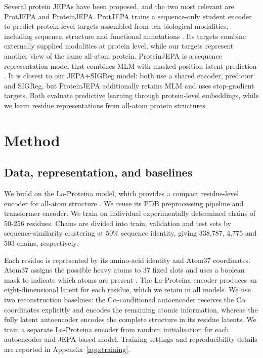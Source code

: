 \documentclass{article}
\begin{document}
Several protein JEPAs have been proposed, and the two most relevant are ProtJEPA and ProteinJEPA. ProtJEPA trains a sequence-only student encoder to predict protein-level targets assembled from ten biological modalities, including sequence, structure and functional annotations \citep{ravideshik2026protjepa}. Its targets combine externally supplied modalities at protein level, while our targets represent another view of the same all-atom protein. ProteinJEPA is a sequence representation model that combines MLM with masked-position latent prediction \citep{ofer2026proteinjepa}. It is closest to our JEPA+SIGReg model: both use a shared encoder, predictor and SIGReg, but ProteinJEPA additionally retains MLM and uses stop-gradient targets. Both evaluate predictive learning through protein-level embeddings, while we learn residue representations from all-atom protein structures.
\section{Method}
\label{sec:method}

\subsection{Data, representation, and baselines}

We build on the La-Proteina model, which provides a compact residue-level encoder for all-atom structure \citep{la-proteina}. We reuse its PDB preprocessing pipeline and transformer encoder. We train on individual experimentally determined chains of 50-256 residues. Chains are divided into train, validation and test sets by sequence-similarity clustering at 50\% sequence identity, giving 338{,}787, 4{,}775 and 503 chains, respectively.

Each residue is represented by its amino-acid identity and Atom37 coordinates. Atom37 assigns the possible heavy atoms to 37 fixed slots and uses a boolean mask to indicate which atoms are present \citep{ahdritz2024openfold}. The La-Proteina encoder produces an eight-dimensional latent for each residue, which we retain in all models. We use two reconstruction baselines: the C$\alpha$-conditioned autoencoder receives the C$\alpha$ coordinates explicitly and encodes the remaining atomic information, whereas the fully latent autoencoder encodes the complete structure in its residue latents. We train a separate La-Proteina encoder from random initialisation for each autoencoder and JEPA-based model. Training settings and reproducibility details are reported in Appendix~\ref{app:training}.
\end{document}

